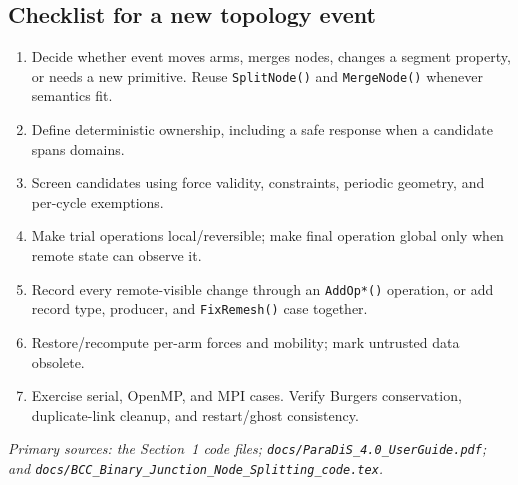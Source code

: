 \documentclass[11pt]{article}
\newcommand{\code}[1]{\texorpdfstring{\nolinkurl{#1}}{#1}}
\begin{document}
\subsection{Checklist for a new topology event}

\begin{enumerate}
\item Decide whether event moves arms, merges nodes, changes a segment
property, or needs a new primitive. Reuse \code{SplitNode()} and
\code{MergeNode()} whenever semantics fit.
\item Define deterministic ownership, including a safe response when a
candidate spans domains.
\item Screen candidates using force validity, constraints, periodic geometry,
and per-cycle exemptions.
\item Make trial operations local/reversible; make final operation global only
when remote state can observe it.
\item Record every remote-visible change through an \code{AddOp*()} operation,
or add record type, producer, and \code{FixRemesh()} case together.
\item Restore/recompute per-arm forces and mobility; mark untrusted data
obsolete.
\item Exercise serial, OpenMP, and MPI cases. Verify Burgers conservation,
duplicate-link cleanup, and restart/ghost consistency.
\end{enumerate}

{\footnotesize\noindent\textit{Primary sources: the Section~1 code files;
\code{docs/ParaDiS_4.0_UserGuide.pdf}; and
\code{docs/BCC_Binary_Junction_Node_Splitting_code.tex}.}\par}
\end{document}
